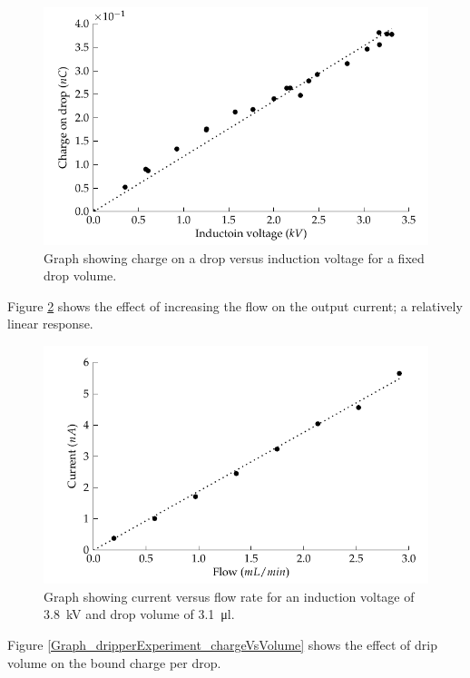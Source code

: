     \begin{figure}
        \includegraphics{content/appendices/chargedWaterDrops/graphics/dripper_chargeVsVoltage}
        \caption{\label{Figure_Graph_dripper_chargeVsVoltage}Graph showing charge on a drop versus induction voltage for a fixed drop volume.}
    \end{figure} 
    Figure \ref{Figure_Graph_dripper_currentVsFlow} shows the effect of increasing the flow on the output current; a relatively linear response.
    \begin{figure}
        \centering
        \includegraphics{content/appendices/chargedWaterDrops/graphics/dripper_currentVsFlow}
        \caption{\label{Figure_Graph_dripper_currentVsFlow}Graph showing current versus flow rate for an induction voltage of \SI{3.8}{\kilo\volt} and drop volume of \SI{3.1}{\micro\litre}.}
    \end{figure}
    Figure \ref{Graph_dripperExperiment_chargeVsVolume} shows the effect of drip volume on the bound charge per drop.
